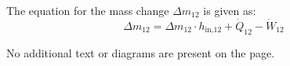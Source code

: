 The equation for the mass change \( \Delta m_{12} \) is given as:  
\[
\Delta m_{12} = \Delta m_{12} \cdot h_{\text{in,12}} + \dot{Q}_{12} - \dot{W}_{12}
\]  

No additional text or diagrams are present on the page.